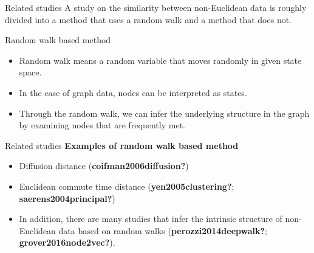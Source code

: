 \documentclass[
  ignorenonframetext,
]{beamer}
\providecommand{\tightlist}{%
  \setlength{\itemsep}{0pt}\setlength{\parskip}{0pt}}\usepackage{longtable,booktabs,array}
\begin{document}
\begin{frame}{Related studies}
\label{related-studies-5}
A study on the similarity between non-Euclidean data is roughly divided
into a method that uses a random walk and a method that does not.

\begin{block}{Random walk based method}
\label{random-walk-based-method}
\begin{itemize}
\tightlist
\item
  Random walk means a random variable that moves randomly in given state
  space.
\item
  In the case of graph data, nodes can be interpreted as states.
\item
  Through the random walk, we can infer the underlying structure in the
  graph by examining nodes that are frequently met.
\end{itemize}
\end{block}
\end{frame}

\begin{frame}{Related studies}
\label{related-studies-6}
\textbf{Examples of random walk based method}

\begin{itemize}
\tightlist
\item
  Diffusion distance (\textbf{coifman2006diffusion?})
\item
  Euclidean commute time distance (\textbf{yen2005clustering?};
  \textbf{saerens2004principal?})
\item
  In addition, there are many studies that infer the intrinsic structure
  of non-Euclidean data based on random walks
  (\textbf{perozzi2014deepwalk?}; \textbf{grover2016node2vec?}).
\end{itemize}
\end{frame}
\end{document}
